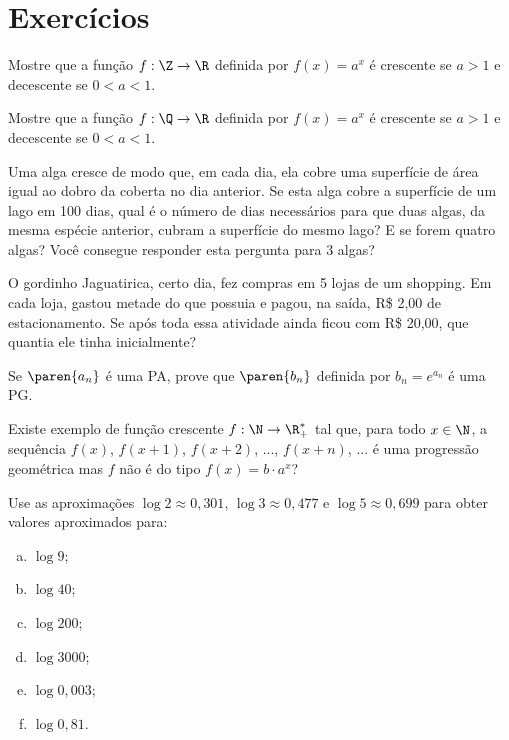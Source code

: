 \section{Exercícios}

\begin{exercise}
    Mostre que a função $f: \Z \to \R$ definida por $f(x)=a^x$ é
crescente se $a>1$ e decescente se $0<a<1$.
\end{exercise}

\begin{exercise}
    Mostre que a função $f: \Q \to \R$ definida por $f(x)=a^x$ é
crescente se $a>1$ e decescente se $0<a<1$.
\end{exercise}

\begin{exercise}
    Uma alga cresce de modo que, em cada dia, ela cobre uma
superfície de área igual ao dobro da coberta no dia anterior. Se
esta alga cobre a superfície de um lago em 100 dias, qual é o número
de dias necessários para que duas algas, da mesma espécie anterior,
cubram a superfície do mesmo lago? E se forem quatro algas? Você
consegue responder esta pergunta para 3 algas?
\end{exercise}

\begin{exercise}
    O gordinho Jaguatirica, certo dia, fez compras em 5 lojas de um
shopping. Em cada loja, gastou metade do que possuia e pagou, na
saída, R\$ 2{,}00 de estacionamento. Se após toda essa atividade
ainda ficou com R\$ 20{,}00, que quantia ele tinha inicialmente?
\end{exercise}

\begin{exercise}
    Se $\paren{a_n}$ é uma PA, prove que $\paren{ b_n}$ definida por
$b_n = e^{a_n}$ é uma PG.
\end{exercise}

\begin{exercise}
    Existe exemplo de função crescente $f : \N \to \R_+^\ast$ tal
que, para todo $x \in \N$, a sequência $f(x)$, $f(x+1)$, $f(x+2)$,
..., $f(x+n)$, ... é uma progressão geométrica mas $f$ não é do tipo
$f(x) = b \cdot a^x$?
\end{exercise}

\begin{exercise}
    Use as aproximações $\log 2 \approx 0,301$, $\log 3 \approx
0,477$ e $\log 5 \approx 0,699$ para obter valores aproximados para:
\begin{enumerate}[(a)]
  \item $\log 9$;
  \item $\log 40$;
  \item $\log 200$;
  \item $\log 3000$;
  \item $\log 0{,}003$;
  \item $\log 0{,}81$.
\end{enumerate}
\end{exercise}

